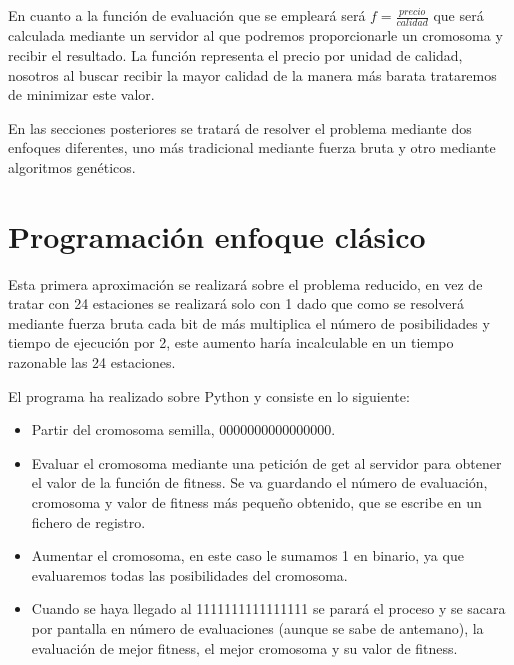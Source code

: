 \documentclass[12pt, spanish, pdftex]{UC3M_document}
\begin{document}
En cuanto a la función de evaluación que se empleará será $f=\frac {precio} {calidad}$ que será calculada mediante un servidor al que podremos proporcionarle un cromosoma y recibir el resultado. La función representa el precio por unidad de calidad, nosotros al buscar recibir la mayor calidad de la manera más barata trataremos de minimizar este valor.

En las secciones posteriores se tratará de resolver el problema mediante dos enfoques diferentes, uno más tradicional mediante fuerza bruta y otro mediante algoritmos genéticos.

\section{Programación enfoque clásico}
Esta primera aproximación se realizará sobre el problema reducido, en vez de tratar con 24 estaciones se realizará solo con 1 dado que como se resolverá mediante fuerza bruta cada bit de más multiplica el número de posibilidades y tiempo de ejecución por 2, este aumento haría incalculable en un tiempo razonable las 24 estaciones.

El programa ha realizado sobre Python y consiste en lo siguiente:
\begin{itemize}
  \item Partir del cromosoma semilla, 0000000000000000.
  \item Evaluar el cromosoma mediante una petición de get al servidor para obtener el valor de la función de fitness. Se va guardando el número de evaluación, cromosoma y valor de fitness más pequeño obtenido, que se escribe en un fichero de registro.
  \item Aumentar el cromosoma, en este caso le sumamos 1 en binario, ya que evaluaremos todas las posibilidades del cromosoma.
  \item Cuando se haya llegado al 1111111111111111 se parará el proceso y se sacara por pantalla en número de evaluaciones (aunque se sabe de antemano), la evaluación de mejor fitness, el mejor cromosoma y su valor de fitness.
\end{itemize}
\end{document}
